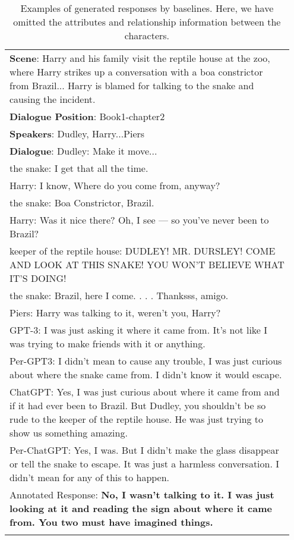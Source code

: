 \documentclass[11pt]{article}
\begin{document}
\begin{table}[!t]\footnotesize
\centering
\small

\begin{tabular}{p{0.95\linewidth}}
\toprule
\textbf{Scene}: Harry and his family visit the reptile house at the zoo, where Harry strikes up a conversation with a boa constrictor from Brazil... Harry is blamed for talking to the snake and causing the incident. \\
\textbf{Dialogue Position}: Book1-chapter2 \\
\textbf{Speakers}: Dudley, Harry...Piers \\
\textbf{Dialogue}:  Dudley: Make it move... \\
the snake: I get that all the time.\\
Harry: I know, Where do you come from, anyway? \\
the snake: Boa Constrictor, Brazil. \\
Harry: Was it nice there? Oh, I see — so you’ve never been to Brazil?\\
keeper of the reptile house: DUDLEY! MR. DURSLEY! COME AND LOOK AT THIS SNAKE! YOU WON’T BELIEVE WHAT IT’S DOING! \\
the snake: Brazil, here I come. . . . Thanksss, amigo.\\
Piers: Harry was talking to it, weren’t you, Harry?\\
\midrule
GPT-3: I was just asking it where it came from. It's not like I was trying to make friends with it or anything.\\
\midrule[0.1pt]
Per-GPT3: I didn't mean to cause any trouble, I was just curious about where the snake came from. I didn't know it would escape.\\
\midrule[0.1pt]
ChatGPT: Yes, I was just curious about where it came from and if it had ever been to Brazil. But Dudley, you shouldn't be so rude to the keeper of the reptile house. He was just trying to show us something amazing. \\
\midrule[0.1pt]
Per-ChatGPT: Yes, I was. But I didn't make the glass disappear or tell the snake to escape. It was just a harmless conversation. I didn't mean for any of this to happen. \\
\midrule[0.1pt]
Annotated Response: \textbf{No, I wasn't talking to it. I was just looking at it and reading the sign about where it came from. You two must have imagined things.}
\\
\bottomrule
\caption{Examples of generated responses by baselines. Here, we have omitted the attributes and relationship information between the characters. } 
\label{tab:case1}
\end{tabular}

\vspace{-10mm}
\end{table} 
\end{document}
